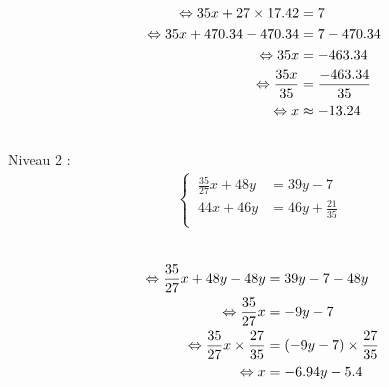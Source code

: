 \documentclass{article}%
\begin{document}
\ \\%
\vspace{5mm}%
\newline%
\begin{align*}%
\ \Leftrightarrow  35x + 27 \times 17.42 &= 7 \\%
\vspace{5mm}%
\newline%
\ \Leftrightarrow  35x + 470.34 -470.34 &= 7 - 470.34 \\%
\vspace{5mm}%
\newline%
\ \Leftrightarrow  35x  &= -463.34 \\%
\vspace{5mm}%
\newline%
\ \Leftrightarrow  \frac{35x}{35} &= \frac{-463.34}{35}\\%
\vspace{5mm}%
\newline%
\ \Leftrightarrow  x &\approx -13.24 \\%
\vspace{5mm}%
\newline%
\end{align*}%
Niveau 2 :%
\begin{align*}%
\begin{cases}%
\  \frac{35}{27}x + 48y &= 39y - 7 \\%
\  44x + 46y &= 46y + \frac{21}{35} \\%
\end{cases}%
\\%
\end{align*}%
\ \\%
\vspace{5mm}%
\newline%
\begin{align*}%
\  \Leftrightarrow  \frac{35}{27}x + 48y - 48y &= 39y - 7 - 48y \\%
\vspace{5mm}%
\newline%
\  \Leftrightarrow  \frac{35}{27}x &= -9y - 7 \\%
\vspace{5mm}%
\newline%
\  \Leftrightarrow  \frac{35}{27}x \times \frac{27}{35} &= (-9y - 7) \times \frac{27}{35} \\%
\vspace{5mm}%
\newline%
\  \Leftrightarrow  x &= -6.94y - 5.4\\%
\vspace{5mm}%
\newline%
\end{align*}%
\end{document}
